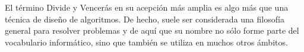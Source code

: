 El término Divide y Vencerás en su acepción más amplia es algo más que una
técnica de diseño de algoritmos. De hecho, suele ser considerada una filosofía
general para resolver problemas y de aquí que su nombre no sólo forme parte del
vocabulario informático, sino que también se utiliza en muchos otros ámbitos.